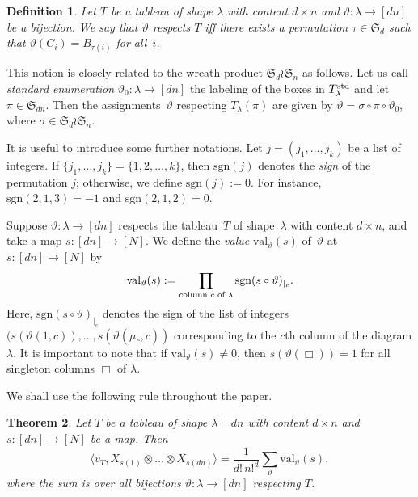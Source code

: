\documentclass[11pt]{amsart}
\def\sgn{\mathrm{sgn}}
\def\la{\lambda}
\def\ot{\otimes}
\def\id{\mathrm{id}}
\newcommand{\aS}{\ensuremath{\mathfrak{S}}}
\newcommand{\val}{\mathrm{val}}
\numberwithin{equation}{section}
\newtheorem{theorem}{Theorem}[section]
\newtheorem{definition}[theorem]{Definition}
\begin{document}
\begin{definition}\label{def:respects}
Let $T$ be a tableau of shape $\la$ with content $d\times n$ 
and $\vartheta\colon\la \to [dn]$ be a bijection. 
We say that $\vartheta$ {\em respects $T$} 
iff there exists a permutation $\tau\in\aS_d$ such that 
$\vartheta(C_i) = B_{\tau(i)}$ for all~$i$. 
\end{definition}

This notion is closely related to the wreath product $\aS_d\wr\aS_n$ as follows. 
Let us call  {\em standard enumeration} $\vartheta_0\colon\la \to [dn]$ %
the labeling of the boxes in $T^\textup{std}_\la$ and let $\pi\in\aS_{dn}$. 
Then the assignments~$\vartheta$ respecting $T_\la(\pi)$ are given by 
$\vartheta = \sigma\circ\pi\circ\vartheta_0$, where $\sigma\in \aS_d\wr\aS_n$.  

It is useful to introduce some further notations. 
Let $j=(j_1,\ldots,j_k)$ be a list of integers. 
If $\{j_1,\ldots,j_k\}=\{1,2,\ldots,k\}$, then $\sgn(j)$ 
denotes the {\em sign} of the permutation $j$; otherwise, we 
define $\sgn(j) :=0$. 
For instance, $\sgn(2,1,3)=-1$ and $\sgn(2,1,2)=0$. 

Suppose $\vartheta\colon\la \to [dn]$ respects the tableau~$T$ of shape~$\la$ 
with content $d\times n$, and take a map $s\colon [dn] \to [N]$. 
We define the {\em value} $\val_\vartheta(s)$ of~$\vartheta$ 
at $s\colon [dn] \to [N]$ by 
\begin{equation}\label{eq:prodcols}
 \val_\vartheta (s) := \prod_{\textup{column $c$ of } \la} \sgn (s\circ\vartheta)_{|_c} .
\end{equation}
Here, $\sgn (s\circ\vartheta)_{|_c}$ denotes the sign of the list of integers 
$(s(\vartheta(1,c)),\ldots,s(\vartheta(\mu_c,c))$ 
corresponding to the $c$th column of the diagram $\la$. 
It is important to note that if $\val_\vartheta (s) \ne 0$, then 
$s(\vartheta(\Box))=1$ for all singleton columns $\Box$ of $\la$.

We shall use the following %
rule throughout the paper.

\begin{theorem}\label{eq:comb_contraction} 
Let $T$ be a tableau of shape $\la\vdash dn$ with content $d\times n$
and $s\colon [dn] \to [N]$ be a map. %
Then 
\begin{equation*}
\langle v_T, X_{s(1)} \ot\ldots\ot X_{s(dn)} \rangle = \frac{1}{d!\, n!^d} 
 \sum_{\vartheta} \val_\vartheta (s) ,
\end{equation*}
where the sum is over all bijections $\vartheta\colon\la\to [dn]$ respecting $T$. 
\end{theorem}
\end{document}
